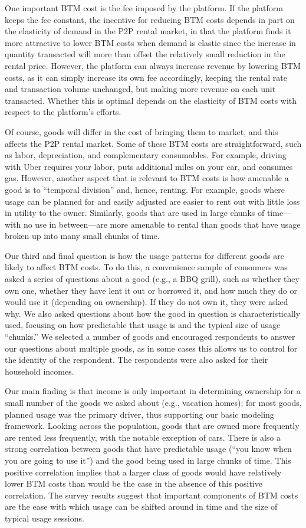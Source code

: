 \documentclass[12pt]{article}
\begin{document}
One important BTM cost is the fee imposed by the platform.
If the platform keeps the fee constant, the incentive for reducing BTM costs depends in part on the elasticity of demand in the P2P rental market, in that the platform finds it more attractive to lower BTM costs when demand is elastic since the increase in quantity transacted will more than offset the relatively small reduction in the rental price.
However, the platform can always increase revenue by lowering BTM costs, as it can simply increase its own fee accordingly, keeping the rental rate and transaction volume unchanged, but making more revenue on each unit transacted.
Whether this is optimal depends on the elasticity of BTM costs with respect to the platform's efforts. 

Of course, goods will differ in the cost of bringing them to market, and this affects the P2P rental market. 
Some of these BTM costs are straightforward, such as labor, depreciation, and complementary consumables.
For example, driving with Uber requires your labor, puts additional miles on your car, and consumes gas.
However, another aspect that is relevant to BTM costs is how amenable a good is to ``temporal division'' and, hence, renting.
For example, goods where usage can be planned for and easily adjusted are easier to rent out with little loss in utility to the owner. 
Similarly, goods that are used in large chunks of time---with no use in between---are more amenable to rental than goods that have usage broken up into many small chunks of time.

Our third and final question is how the usage patterns for different goods are likely to affect BTM costs.
To do this, a convenience sample of consumers was asked a series of questions about a good (e.g., a BBQ grill), such as whether they own one, whether they have lent it out or borrowed it, and how much they do or would use it (depending on ownership). 
If they do not own it, they were asked why. 
We also asked questions about how the good in question is characteristically used, focusing on how predictable that usage is and the typical size of usage ``chunks.''  
We selected a number of goods and encouraged respondents to answer our questions about multiple goods, as in some cases this allows us to control for the identity of the respondent. 
The respondents were also asked for their household incomes.

Our main finding is that income is only important in determining ownership for a small number of the goods we asked about (e.g., vacation homes); 
for most goods, planned usage was the primary driver, thus supporting our basic modeling framework.  
Looking across the population, goods that are owned more frequently are rented less frequently, with the notable exception of cars.
There is also a strong correlation between goods that have predictable usage (``you know when you are going to use it'') and the good being used in large chunks of time.
This positive correlation implies that a larger class of goods would have relatively lower BTM costs than would be the case in the absence of this positive correlation. 
The survey results suggest that important components of BTM costs are the ease with which usage can be shifted around in time and the size of typical usage sessions.
\end{document}

